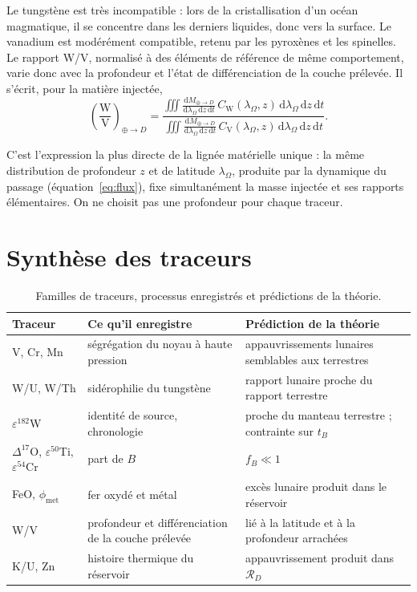 \documentclass[11pt,a4paper,openany]{report}
\newcommand{\dd}{\mathrm{d}}
\newcommand{\RD}{\mathcal{R}_{D}}
\begin{document}
Le tungstène est très incompatible : lors de la cristallisation d'un océan magmatique, il se
concentre dans les derniers liquides, donc vers la surface. Le vanadium est modérément
compatible, retenu par les pyroxènes et les spinelles. Le rapport W/V, normalisé à des éléments de
référence de même comportement, varie donc avec la profondeur et l'état de différenciation de la
couche prélevée. Il s'écrit, pour la matière injectée,
\begin{equation}
\left(\frac{\mathrm{W}}{\mathrm{V}}\right)_{\oplus\to D}=
\frac{\displaystyle\iiint\frac{\dd M_{\oplus\to D}}{\dd\lambda_\Omega\,\dd z\,\dd t}\,
C_{\mathrm{W}}(\lambda_\Omega,z)\,\dd\lambda_\Omega\,\dd z\,\dd t}
{\displaystyle\iiint\frac{\dd M_{\oplus\to D}}{\dd\lambda_\Omega\,\dd z\,\dd t}\,
C_{\mathrm{V}}(\lambda_\Omega,z)\,\dd\lambda_\Omega\,\dd z\,\dd t}.
\label{eq:WV}
\end{equation}

\begin{ideephys}
C'est l'expression la plus directe de la lignée matérielle unique : la même distribution de
profondeur $z$ et de latitude $\lambda_\Omega$, produite par la dynamique du passage
(équation~\eqref{eq:flux}), fixe simultanément la masse injectée et ses rapports élémentaires. On ne
choisit pas une profondeur pour chaque traceur.
\end{ideephys}

\section{Synthèse des traceurs}

\begin{table}[htbp]
\centering
\small
\caption{Familles de traceurs, processus enregistrés et prédictions de la théorie.}
\label{tab:traceurs}
\begin{tabularx}{\textwidth}{>{\raggedright\arraybackslash}p{2.6cm}
>{\raggedright\arraybackslash}X >{\raggedright\arraybackslash}X}
\toprule
\textbf{Traceur} & \textbf{Ce qu'il enregistre} & \textbf{Prédiction de la théorie} \\
\midrule
V, Cr, Mn & ségrégation du noyau à haute pression & appauvrissements lunaires semblables aux terrestres \\
W/U, W/Th & sidérophilie du tungstène & rapport lunaire proche du rapport terrestre \\
$\varepsilon^{182}$W & identité de source, chronologie & proche du manteau terrestre ; contrainte sur $t_B$ \\
$\Delta^{17}$O, $\varepsilon^{50}$Ti, $\varepsilon^{54}$Cr & part de $B$ & $f_B\ll1$ \\
FeO, $\phi_{\mathrm{met}}$ & fer oxydé et métal & excès lunaire produit dans le réservoir \\
W/V & profondeur et différenciation de la couche prélevée & lié à la latitude et à la profondeur arrachées \\
K/U, Zn & histoire thermique du réservoir & appauvrissement produit dans $\RD$ \\
\bottomrule
\end{tabularx}
\end{table}
\end{document}
